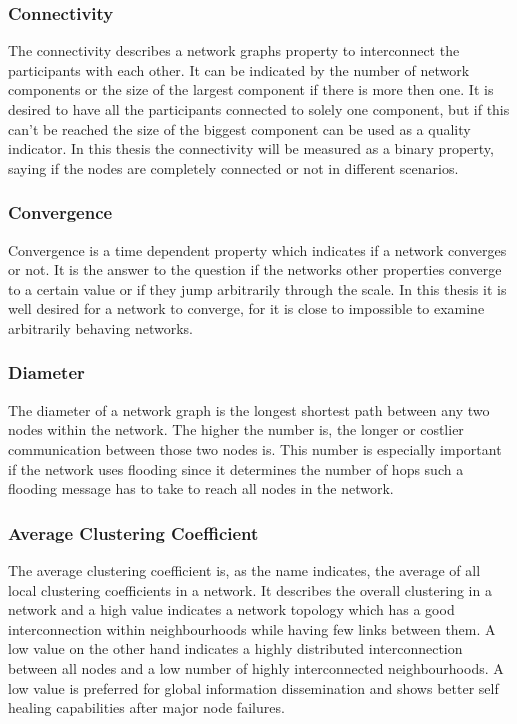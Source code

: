 \subsubsection{Connectivity}
The connectivity describes a network graphs property to interconnect the
participants with each other. It can be indicated by the number of network
components or the size of the largest component if there is more then one. It is
desired to have all the participants connected to solely one component, but if
this can't be reached the size of the biggest component can be used as a quality
indicator. In this thesis the connectivity will be measured as a binary
property, saying if the nodes are completely connected or not in different
scenarios.
\subsubsection{Convergence}
Convergence is a time dependent property which indicates if a network converges
or not. It is the answer to the question if the networks other properties
converge to a certain value or if they jump arbitrarily through the scale.
In this thesis it is well desired for a network to converge, for it is close to
impossible to examine arbitrarily behaving networks.

\subsubsection{Diameter}
The diameter of a network graph is the longest shortest path between any two
nodes within the network. The higher the number is, the longer or costlier
communication between those two nodes is. This number is especially important if
the network uses flooding since it determines the number of hops such a flooding
message has to take to reach all nodes in the network. 

\subsubsection{Average Clustering Coefficient}
The average clustering coefficient is, as the name indicates,  the average of
all local clustering coefficients in a network. It describes the overall
clustering in a network and a high value indicates a network topology which has
a good interconnection within neighbourhoods while having few links between them.
A low value on the other hand indicates a highly distributed interconnection
between all nodes and a low number of highly interconnected neighbourhoods. A low
value is preferred for global information dissemination and shows better self
healing capabilities after major node failures.
